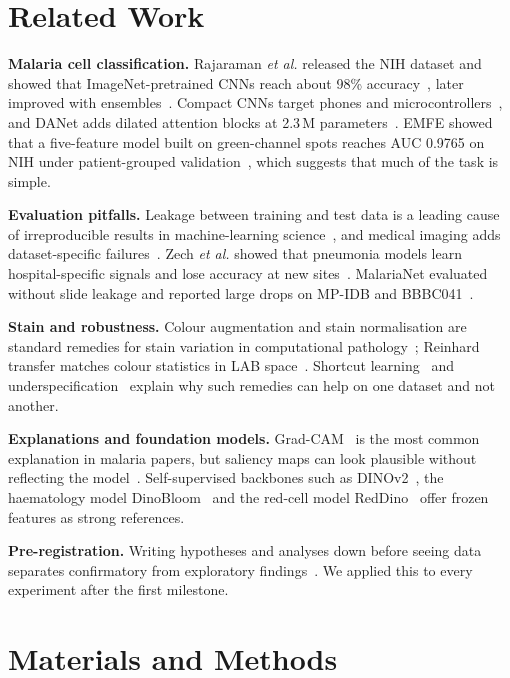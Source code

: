 \documentclass[conference]{IEEEtran}
\begin{document}
\section{Related Work}
\textbf{Malaria cell classification.} Rajaraman \textit{et al.} released the NIH dataset and showed that ImageNet-pretrained CNNs reach about 98\% accuracy~\cite{rajaraman2018}, later improved with ensembles~\cite{rajaraman2019}. Compact CNNs target phones and microcontrollers~\cite{fuhad2020}, and DANet adds dilated attention blocks at 2.3\,M parameters~\cite{ali2025danet}. EMFE showed that a five-feature model built on green-channel spots reaches AUC 0.9765 on NIH under patient-grouped validation~\cite{alkafi2026emfe}, which suggests that much of the task is simple.

\textbf{Evaluation pitfalls.} Leakage between training and test data is a leading cause of irreproducible results in machine-learning science~\cite{kapoor2023}, and medical imaging adds dataset-specific failures~\cite{varoquaux2022}. Zech \textit{et al.} showed that pneumonia models learn hospital-specific signals and lose accuracy at new sites~\cite{zech2018}. MalariaNet evaluated without slide leakage and reported large drops on MP-IDB and BBBC041~\cite{hou2026malarianet}.

\textbf{Stain and robustness.} Colour augmentation and stain normalisation are standard remedies for stain variation in computational pathology~\cite{tellez2019}; Reinhard transfer matches colour statistics in LAB space~\cite{reinhard2001}. Shortcut learning~\cite{geirhos2020} and underspecification~\cite{damour2022} explain why such remedies can help on one dataset and not another.

\textbf{Explanations and foundation models.} Grad-CAM~\cite{selvaraju2017} is the most common explanation in malaria papers, but saliency maps can look plausible without reflecting the model~\cite{adebayo2018}. Self-supervised backbones such as DINOv2~\cite{oquab2023}, the haematology model DinoBloom~\cite{koch2024} and the red-cell model RedDino~\cite{zedda2025} offer frozen features as strong references.

\textbf{Pre-registration.} Writing hypotheses and analyses down before seeing data separates confirmatory from exploratory findings~\cite{nosek2018}. We applied this to every experiment after the first milestone.

\section{Materials and Methods}
\end{document}
